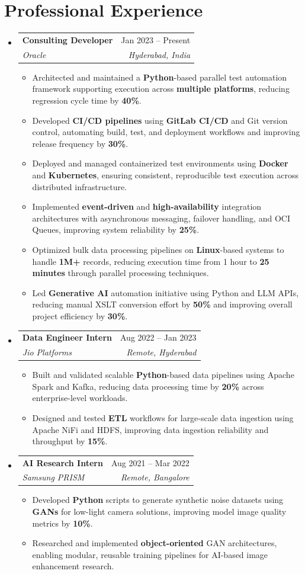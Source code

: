 \documentclass[letterpaper,11pt]{article}
\makeatletter
\newcommand{\resumeItem}[1]{
  \item\small{
    {#1 \vspace{-2pt}}
  }
}
\newcommand{\resumeSubheading}[4]{
  \vspace{-2pt}\item
    \begin{tabular*}{0.97\textwidth}[t]{l@{\extracolsep{\fill}}r}
      \textbf{#1} & #2 \\
      \textit{\small#3} & \textit{\small #4} \\
    \end{tabular*}\vspace{-7pt}
}
\newcommand{\resumeSubHeadingListStart}{\begin{itemize}[leftmargin=0.15in, label={}]}
\newcommand{\resumeSubHeadingListEnd}{\end{itemize}}
\newcommand{\resumeItemListStart}{\begin{itemize}}
\newcommand{\resumeItemListEnd}{\end{itemize}\vspace{-5pt}}
\makeatother
\begin{document}
\section{Professional Experience}
\resumeSubHeadingListStart
    \resumeSubheading
      {Consulting Developer}{Jan 2023 -- Present}
      {Oracle}{Hyderabad, India}
      \resumeItemListStart
        \resumeItem{Architected and maintained a \textbf{Python}-based parallel test automation framework supporting execution across \textbf{multiple platforms}, reducing regression cycle time by \textbf{40\%}.}
        \resumeItem{Developed \textbf{CI/CD pipelines} using \textbf{GitLab CI/CD} and Git version control, automating build, test, and deployment workflows and improving release frequency by \textbf{30\%}.}
        \resumeItem{Deployed and managed containerized test environments using \textbf{Docker} and \textbf{Kubernetes}, ensuring consistent, reproducible test execution across distributed infrastructure.}
        \resumeItem{Implemented \textbf{event-driven} and \textbf{high-availability} integration architectures with asynchronous messaging, failover handling, and OCI Queues, improving system reliability by \textbf{25\%}.}
        \resumeItem{Optimized bulk data processing pipelines on \textbf{Linux}-based systems to handle \textbf{1M+} records, reducing execution time from 1 hour to \textbf{25 minutes} through parallel processing techniques.}
        \resumeItem{Led \textbf{Generative AI} automation initiative using Python and LLM APIs, reducing manual XSLT conversion effort by \textbf{50\%} and improving overall project efficiency by \textbf{30\%}.}
      \resumeItemListEnd
    \resumeSubheading
      {Data Engineer Intern}{Aug 2022 -- Jan 2023}
      {Jio Platforms}{Remote, Hyderabad}
      \resumeItemListStart
        \resumeItem{Built and validated scalable \textbf{Python}-based data pipelines using Apache Spark and Kafka, reducing data processing time by \textbf{20\%} across enterprise-level workloads.}
        \resumeItem{Designed and tested \textbf{ETL} workflows for large-scale data ingestion using Apache NiFi and HDFS, improving data ingestion reliability and throughput by \textbf{15\%}.}
      \resumeItemListEnd
    \resumeSubheading
      {AI Research Intern}{Aug 2021 -- Mar 2022}
      {Samsung PRISM}{Remote, Bangalore}
      \resumeItemListStart
        \resumeItem{Developed \textbf{Python} scripts to generate synthetic noise datasets using \textbf{GANs} for low-light camera solutions, improving model image quality metrics by \textbf{10\%}.}
        \resumeItem{Researched and implemented \textbf{object-oriented} GAN architectures, enabling modular, reusable training pipelines for AI-based image enhancement research.}
      \resumeItemListEnd
\resumeSubHeadingListEnd
\end{document}
